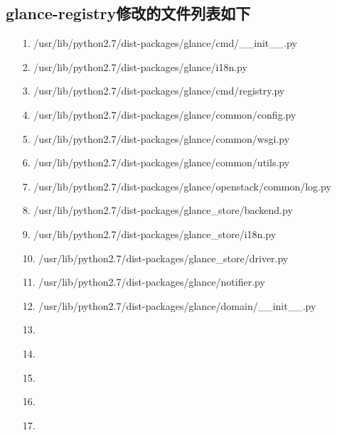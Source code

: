 \documentclass[a4paper,left=1.5cm,right=1.5cm,11pt]{article}
\begin{document}
\subsection{glance-registry修改的文件列表如下}
	\begin{itemize}
		\item[1.]/usr/lib/python2.7/dist-packages/glance/cmd/__init__.py
		\item[2.]/usr/lib/python2.7/dist-packages/glance/i18n.py
		\item[3.]/usr/lib/python2.7/dist-packages/glance/cmd/registry.py
		\item[4.]/usr/lib/python2.7/dist-packages/glance/common/config.py
		\item[5.]/usr/lib/python2.7/dist-packages/glance/common/wsgi.py
		\item[6.]/usr/lib/python2.7/dist-packages/glance/common/utils.py
		\item[7.]/usr/lib/python2.7/dist-packages/glance/openstack/common/log.py
		\item[8.]/usr/lib/python2.7/dist-packages/glance_store/backend.py
		\item[9.]/usr/lib/python2.7/dist-packages/glance_store/i18n.py
		\item[10.]/usr/lib/python2.7/dist-packages/glance_store/driver.py
		\item[11.]/usr/lib/python2.7/dist-packages/glance/notifier.py
		\item[12.]/usr/lib/python2.7/dist-packages/glance/domain/__init__.py
		\item[13.]
		\item[14.]
		\item[15.]
		\item[16.]
		\item[17.]

	\end{itemize}
\end{document}
